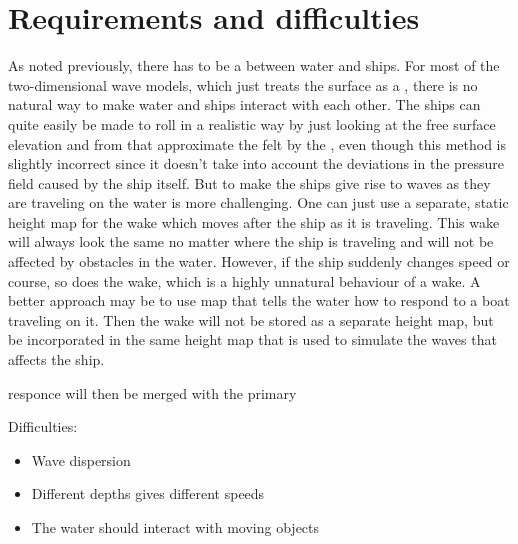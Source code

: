\chapter{Requirements and difficulties}

As noted previously, there has to be a  between water and ships. For most of the two-dimensional wave models, which just treats the surface as a , there is no natural way to make water and ships interact with each other. The ships can quite easily be made to roll in a realistic way by just looking at the free surface elevation and from that approximate the  felt by the , even though this method is slightly incorrect since it doesn't take into account the deviations in the pressure field caused by the ship itself. But to make the ships give rise to waves as they are traveling on the water is more challenging. One can just use a separate, static height map for the wake which moves after the ship as it is traveling. This wake will always look the same no matter where the ship is traveling and will not be affected by obstacles in the water. However, if the ship suddenly changes speed or course, so does the wake, which is a highly unnatural behaviour of a wake. A better approach may be to use map that tells the water how to respond to a boat traveling on it. Then the wake will not be stored as a separate height map, but be incorporated in the same height map that is used to simulate the waves that affects the ship.

responce will then be merged with the primary 

Difficulties:
\begin{itemize}
    \item Wave dispersion
    \item Different depths gives different speeds
    \item The water should interact with moving objects
\end{itemize}